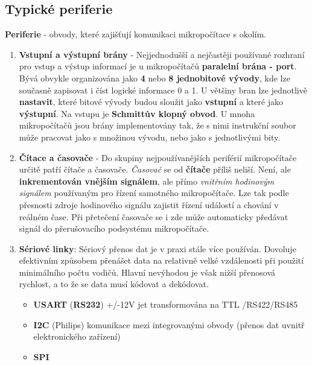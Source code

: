 \subsection*{Typické periferie}
\textbf{Periferie} - obvody, které zajišťují komunikaci mikropočítace s okolím.

\begin{enumerate}
\item \textbf{Vstupní a výstupní brány} - Nejjednodušší a nejčastěji používané rozhraní pro vstup a výstup informací je u mikropočítačů \textbf{paralelní brána - port}. Bývá obvykle organizována jako \textbf{4} nebo \textbf{8 jednobitové vývody}, kde lze současně zapisovat i číst logické informace 0 a 1. U většiny bran lze jednotlivě \textbf{nastavit}, které bitové vývody budou sloužit jako \textbf{vstupní} a které jako \textbf{výstupní}. Na vstupu je \textbf{Schmittův klopný obvod}. U mnoha mikropočítačů jsou brány implementovány tak, že s nimi instrukční soubor může pracovat jako s množinou vývodu, nebo jako s jednotlivými bity.

\item \textbf{Čítace a časovače} - Do skupiny nejpoužívanějších periférií mikropočítače určitě patří čítače a časovače.
\emph{Časovač} se od \textbf{čítače} příliš neliší. Není, ale \textbf{inkrementován vnějším signálem}, ale přímo \emph{vnitřním hodinovým signálem} používaným pro řízení samotného mikropočítače. Lze tak podle přesnosti zdroje hodinového signálu zajistit řízení událostí a chování v reálném čase. Při přetečení časovače se i zde může automaticky předávat signál do přerušovacího podsystému mikropočítače.

\item \textbf{Sériové linky}: Sériový přenos dat je v praxi stále více používán. Dovoluje efektivním způsobem
přenášet data na relativně velké vzdálenosti při použití minimálního počtu vodičů. Hlavní nevýhodou je však nižší přenosová rychlost, a to že se data musí kódovat a dekódovat.
\begin{itemize}
\item \textbf{USART} (\textbf{RS232}) +/-12V jet transformována na TTL /RS422/RS485
\item \textbf{I2C} (Philips) komunikace mezi integrovanými obvody (přenos dat uvnitř elektronického zařízení)
\item \textbf{SPI}
\end{itemize}


\end{enumerate}
